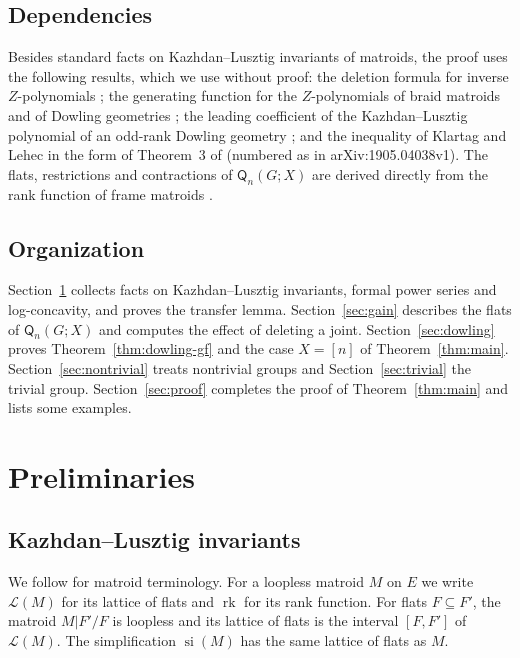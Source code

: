 \documentclass[11pt]{amsart}
\theoremstyle{definition}
\theoremstyle{remark}
\numberwithin{equation}{section}
\newcommand{\Q}{\mathsf{Q}}
\newcommand{\rk}{\operatorname{rk}}
\newcommand{\si}{\operatorname{si}}
\newcommand{\cL}{\mathcal{L}}
\begin{document}
\subsection*{Dependencies}
Besides standard facts on Kazhdan--Lusztig invariants of matroids, the proof uses the following results, which we use without proof: the deletion formula for inverse $Z$-polynomials \cite[Theorem~1.4]{BFMN25}; the generating function for the $Z$-polynomials of braid matroids \cite[Propositions~2.3 and~2.8, Corollary~3.2]{FL24} and of Dowling geometries \cite[Theorem~1.1 and Proposition~3.2]{FL26}; the leading coefficient of the Kazhdan--Lusztig polynomial of an odd-rank Dowling geometry \cite[Example~4.2]{FL26}; and the inequality of Klartag and Lehec \cite{KL19} in the form of Theorem~3 of \cite{GRST19} (numbered as in arXiv:1905.04038v1). The flats, restrictions and contractions of $\Q_n(G;X)$ are derived directly from the rank function of frame matroids \cite{Zas91,Zas22}.

\subsection*{Organization}
Section~\ref{sec:prelim} collects facts on Kazhdan--Lusztig invariants, formal power series and log-concavity, and proves the transfer lemma. Section~\ref{sec:gain} describes the flats of $\Q_n(G;X)$ and computes the effect of deleting a joint. Section~\ref{sec:dowling} proves Theorem~\ref{thm:dowling-gf} and the case $X=[n]$ of Theorem~\ref{thm:main}. Section~\ref{sec:nontrivial} treats nontrivial groups and Section~\ref{sec:trivial} the trivial group. Section~\ref{sec:proof} completes the proof of Theorem~\ref{thm:main} and lists some examples.

\section{Preliminaries}\label{sec:prelim}

\subsection{Kazhdan--Lusztig invariants}
We follow \cite{Oxl11} for matroid terminology. For a loopless matroid $M$ on $E$ we write $\cL(M)$ for its lattice of flats and $\rk$ for its rank function. For flats $F\subseteq F'$, the matroid $M|F'/F$ is loopless and its lattice of flats is the interval $[F,F']$ of $\cL(M)$. The simplification $\si(M)$ has the same lattice of flats as $M$.
\end{document}
